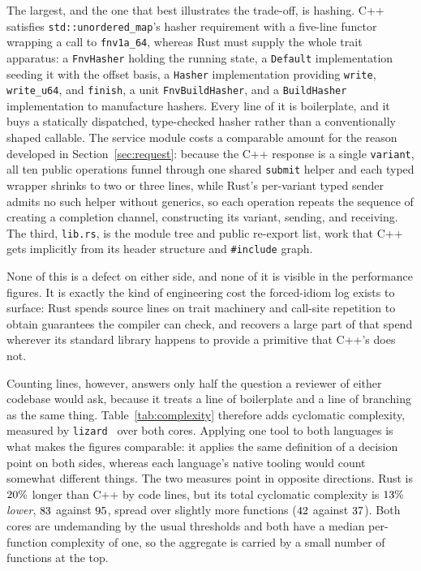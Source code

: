 \documentclass[english,twoside,openright,a4paper,censored,csm,software-track-2020]{HYthesisML}
\begin{document}
The largest, and the one that best illustrates the trade-off, is hashing. C++ satisfies
\texttt{std::unordered\_map}'s hasher requirement with a five-line functor wrapping a call to
\texttt{fnv1a\_64}, whereas Rust must supply the whole trait apparatus: a \texttt{FnvHasher}
holding the running state, a \texttt{Default} implementation seeding it with the offset basis,
a \texttt{Hasher} implementation providing \texttt{write}, \texttt{write\_u64}, and
\texttt{finish}, a unit \texttt{FnvBuildHasher}, and a \texttt{BuildHasher} implementation to
manufacture hashers. Every line of it is boilerplate, and it buys a statically dispatched,
type-checked hasher rather than a conventionally shaped callable. The service module costs a
comparable amount for the reason developed in Section~\ref{sec:request}: because the C++
response is a single \texttt{variant}, all ten public operations funnel through one shared
\texttt{submit} helper and each typed wrapper shrinks to two or three lines, while Rust's
per-variant typed sender admits no such helper without generics, so each operation repeats the
sequence of creating a completion channel, constructing its variant, sending, and receiving.
The third, \texttt{lib.rs}, is the module tree and public re-export list, work that C++ gets
implicitly from its header structure and \texttt{\#include} graph.

None of this is a defect on either side, and none of it is visible in the performance figures.
It is exactly the kind of engineering cost the forced-idiom log exists to surface: Rust spends
source lines on trait machinery and call-site repetition to obtain guarantees the compiler can
check, and recovers a large part of that spend wherever its standard library happens to
provide a primitive that C++'s does not.

Counting lines, however, answers only half the question a reviewer of either codebase would
ask, because it treats a line of boilerplate and a line of branching as the same thing.
Table~\ref{tab:complexity} therefore adds cyclomatic complexity, measured by
\texttt{lizard}~\cite{lizard} over both cores. Applying one tool to both languages is what makes
the figures comparable: it applies the same definition of a decision point on both sides,
whereas each language's native tooling would count somewhat different things. The two measures
point in opposite directions. Rust is $20\%$ longer than C++ by code lines, but its
total cyclomatic complexity is $13\%$ \emph{lower}, $83$ against
$95$, spread over slightly more functions ($42$ against $37$). Both
cores are undemanding by the usual thresholds and both have a median per-function complexity
of one, so the aggregate is carried by a small number of functions at the top.
\end{document}
